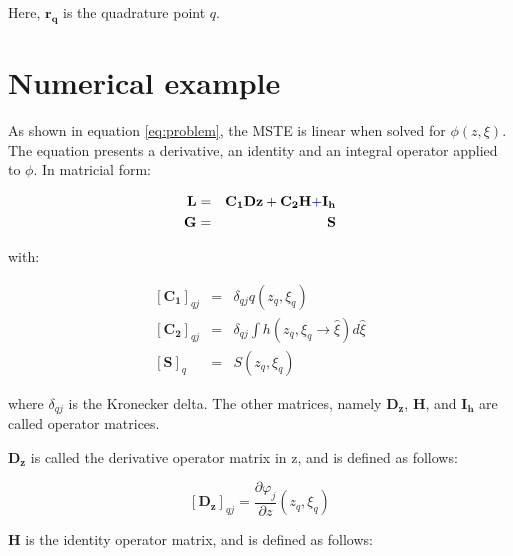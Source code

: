 \documentclass{CFD2011}
\newcommand{\Pablo}[1]{\textcolor{blue}{#1}}
\begin{document}
Here, $\mathbf{r_q}$ is the quadrature point $q$.

\section{Numerical example}
%
%
As shown in equation \ref{eq:problem}, the MSTE is linear when solved for $\phi(z,\xi)$. 
The equation presents a derivative, an identity and an integral operator applied to $\phi$. In matricial form:

\begin{eqnarray}
\mathbf{L}&=&\mathbf{C_1}\mathbf{Dz}+\mathbf{C_2}\mathbf{H} \Pablo{+} \mathbf{I_h} \\
\mathbf{G}&=&\mathbf{S}
\end{eqnarray}

\noindent with:

\begin{eqnarray}
\left[\mathbf{C_1}\right]_{qj}&=& \delta_{qj}q(z_q,\xi_q) \nonumber \\
\left[\mathbf{C_2}\right]_{qj}&=& \delta_{qj}\int h(z_q,\xi_q\rightarrow\hat{\xi})d\hat{\xi} \nonumber \\
\left[\mathbf{S}\right]_{q}&=& S(z_q,\xi_q) \nonumber 
\end{eqnarray}

\noindent where $\delta_{qj}$ is the Kronecker delta. The other matrices, namely $\mathbf{D_z}$, $\mathbf{H}$, and $\mathbf{I_h}$ are called operator matrices.


$\mathbf{D_z}$ is called the derivative operator matrix in z, and is defined as follows:

\begin{equation}
\left[\mathbf{D_z}\right]_{qj}=\frac{\partial \varphi_j}{\partial z}(z_q,\xi_q)
\end{equation}

$\mathbf{H}$ is the identity operator matrix, and is defined as follows:
\end{document}
